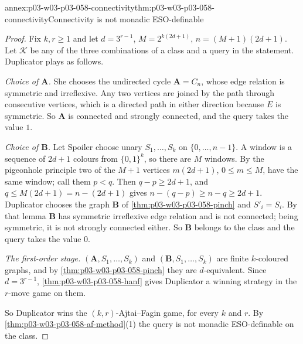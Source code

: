 \begin{annexitem}{annex:p03-w03-p03-058-connectivity}{thm:p03-w03-p03-058-connectivity}{Connectivity is not monadic ESO-definable}
\begin{proof}
Fix \(k,r\ge1\) and let \(d=3^{r-1}\), \(M=2^{k(2d+1)}\),
\(n=(M+1)(2d+1)\). Let \(\mathcal K\) be any of the three combinations of a
class and a query in the statement. Duplicator plays as follows.

\emph{Choice of \(\mathbf A\).} She chooses the undirected cycle
\(\mathbf A=C_n\), whose edge relation is symmetric and irreflexive. Any two
vertices are joined by the path through consecutive vertices, which is a
directed path in either direction because \(E\) is symmetric. So
\(\mathbf A\) is connected and strongly connected, and the query takes the
value \(1\).

\emph{Choice of \(\mathbf B\).} Let Spoiler choose unary
\(S_1,\ldots,S_k\) on \(\{0,\ldots,n-1\}\). A window is a sequence of
\(2d+1\) colours from \(\{0,1\}^k\), so there are \(M\) windows. By the
pigeonhole principle two of the \(M+1\) vertices \(m(2d+1)\),
\(0\le m\le M\), have the same window; call them \(p<q\). Then
\(q-p\ge2d+1\), and \(q\le M(2d+1)=n-(2d+1)\) gives
\(n-(q-p)\ge n-q\ge2d+1\). Duplicator chooses the graph \(\mathbf B\) of
\cref{thm:p03-w03-p03-058-pinch} and \(S'_i=S_i\). By that lemma
\(\mathbf B\) has symmetric irreflexive edge relation and is not connected;
being symmetric, it is not strongly connected either. So \(\mathbf B\)
belongs to the class and the query takes the value \(0\).

\emph{The first-order stage.} \((\mathbf A,S_1,\ldots,S_k)\) and
\((\mathbf B,S_1,\ldots,S_k)\) are finite \(k\)-coloured graphs, and by
\cref{thm:p03-w03-p03-058-pinch} they are \(d\)-equivalent. Since
\(d=3^{r-1}\), \cref{thm:p03-w03-p03-058-hanf} gives Duplicator a winning
strategy in the \(r\)-move game on them.

So Duplicator wins the \((k,r)\)-Ajtai--Fagin game, for every \(k\) and
\(r\). By \cref{thm:p03-w03-p03-058-af-method}(1) the query is not monadic
ESO-definable on the class.
\end{proof}
\end{annexitem}


